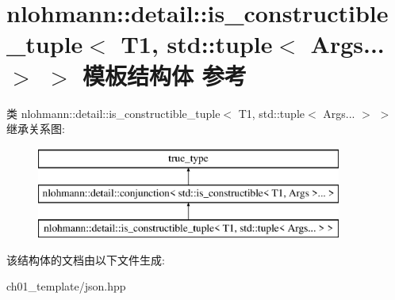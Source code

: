 \hypertarget{structnlohmann_1_1detail_1_1is__constructible__tuple_3_01_t1_00_01std_1_1tuple_3_01_args_8_8_8_01_4_01_4}{}\section{nlohmann\+::detail\+::is\+\_\+constructible\+\_\+tuple$<$ T1, std\+::tuple$<$ Args... $>$ $>$ 模板结构体 参考}
\label{structnlohmann_1_1detail_1_1is__constructible__tuple_3_01_t1_00_01std_1_1tuple_3_01_args_8_8_8_01_4_01_4}
类 nlohmann\+::detail\+::is\+\_\+constructible\+\_\+tuple$<$ T1, std\+::tuple$<$ Args... $>$ $>$ 继承关系图\+:\begin{figure}[H]
\begin{center}
\leavevmode
\includegraphics[height=3.000000cm]{structnlohmann_1_1detail_1_1is__constructible__tuple_3_01_t1_00_01std_1_1tuple_3_01_args_8_8_8_01_4_01_4}
\end{center}
\end{figure}


该结构体的文档由以下文件生成\+:\begin{DoxyCompactItemize}
\item 
ch01\+\_\+template/json.\+hpp\end{DoxyCompactItemize}
